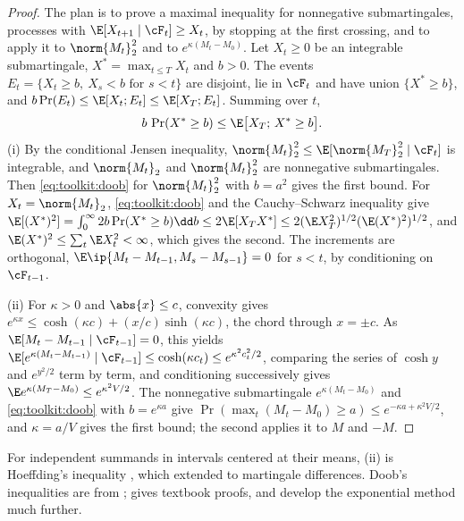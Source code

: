 \begin{refsection}
\begin{proof}
The plan is to prove a maximal inequality for nonnegative submartingales, processes with $\E[X_{t+1}\mid\cF_t]\ge X_t$, by stopping at the first crossing, and to apply it to $\norm{M_t}_2^2$ and to $e^{\kappa(M_t-M_0)}$. Let $X_t\ge0$ be an integrable submartingale, $X^*=\max_{t\le T}X_t$ and $b>0$. The events $E_t=\{X_t\ge b,\ X_s<b\text{ for }s<t\}$ are disjoint, lie in $\cF_t$ and have union $\{X^*\ge b\}$, and $b\Pr(E_t)\le\E[X_t;E_t]\le\E[X_T;E_t]$. Summing over $t$,
\begin{equation}\label{eq:toolkit:doob}
  b\,\Pr(X^*\ge b)\le\E\bigl[X_T;\,X^*\ge b\bigr].
\end{equation}
(i) By the conditional Jensen inequality, $\norm{M_t}_2^2\le\E[\norm{M_T}_2^2\mid\cF_t]$ is integrable, and $\norm{M_t}_2$ and $\norm{M_t}_2^2$ are nonnegative submartingales. Then \eqref{eq:toolkit:doob} for $\norm{M_t}_2^2$ with $b=a^2$ gives the first bound. For $X_t=\norm{M_t}_2$, \eqref{eq:toolkit:doob} and the Cauchy--Schwarz inequality give $\E[(X^*)^2]=\int_0^\infty2b\Pr(X^*\ge b)\dd b\le2\E[X_TX^*]\le2(\E X_T^2)^{1/2}(\E(X^*)^2)^{1/2}$, and $\E(X^*)^2\le\sum_t\E X_t^2<\infty$, which gives the second. The increments are orthogonal, $\E\ip{M_t-M_{t-1},M_s-M_{s-1}}=0$ for $s<t$, by conditioning on $\cF_{t-1}$.

(ii) For $\kappa>0$ and $\abs{x}\le c$, convexity gives $e^{\kappa x}\le\cosh(\kappa c)+(x/c)\sinh(\kappa c)$, the chord through $x=\pm c$. As $\E[M_t-M_{t-1}\mid\cF_{t-1}]=0$, this yields $\E[e^{\kappa(M_t-M_{t-1})}\mid\cF_{t-1}]\le\cosh(\kappa c_t)\le e^{\kappa^2c_t^2/2}$, comparing the series of $\cosh y$ and $e^{y^2/2}$ term by term, and conditioning successively gives $\E e^{\kappa(M_T-M_0)}\le e^{\kappa^2V/2}$. The nonnegative submartingale $e^{\kappa(M_t-M_0)}$ and \eqref{eq:toolkit:doob} with $b=e^{\kappa a}$ give $\Pr(\max_t(M_t-M_0)\ge a)\le e^{-\kappa a+\kappa^2V/2}$, and $\kappa=a/V$ gives the first bound; the second applies it to $M$ and $-M$.
\end{proof}

For independent summands in intervals centered at their means, (ii) is Hoeffding's inequality \parencite{Hoeffding1963}, which \textcite{Azuma1967} extended to martingale differences. Doob's inequalities are from \textcite{Doob1953}; \textcite{Williams1991} gives textbook proofs, and \textcite{BoucheronLugosiMassart2013} develop the exponential method much further.


\end{refsection}
